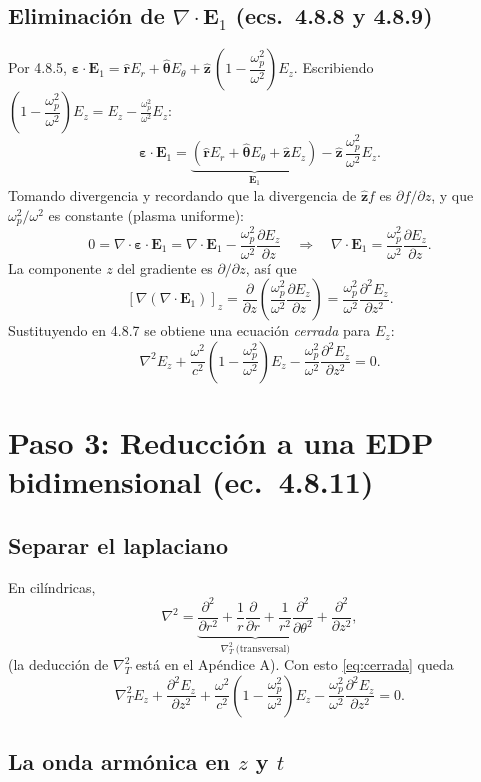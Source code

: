 \documentclass[11pt,a4paper]{article}
\newcommand{\E}{\mathbf{E}}
\newcommand{\eps}{\boldsymbol{\varepsilon}}
\renewcommand{\wp}{\omega_p}
\newcommand{\rr}{\hat{\mathbf{r}}}
\newcommand{\tth}{\hat{\boldsymbol{\theta}}}
\newcommand{\zz}{\hat{\mathbf{z}}}
\newcommand{\Kp}{\left(1-\dfrac{\wp^2}{\omega^2}\right)}
\begin{document}
\subsection{Eliminación de $\nabla\cdot\E_1$ (ecs.\ 4.8.8 y 4.8.9)}
Por 4.8.5, $\eps\cdot\E_1=\rr E_r+\tth E_\theta+\zz\,\Kp E_z$. Escribiendo $\Kp E_z=E_z-\frac{\wp^2}{\omega^2}E_z$:
\[
\eps\cdot\E_1=\underbrace{\left(\rr E_r+\tth E_\theta+\zz E_z\right)}_{\E_1}-\zz\,\frac{\wp^2}{\omega^2}E_z .
\]
Tomando divergencia y recordando que la divergencia de $\zz f$ es $\partial f/\partial z$, y que $\wp^2/\omega^2$ es constante (plasma uniforme):
\[
0=\nabla\cdot\eps\cdot\E_1=\nabla\cdot\E_1-\frac{\wp^2}{\omega^2}\frac{\partial E_z}{\partial z}
\quad\Longrightarrow\quad
\nabla\cdot\E_1=\frac{\wp^2}{\omega^2}\frac{\partial E_z}{\partial z}. \tag{4.8.8}
\]
La componente $z$ del gradiente es $\partial/\partial z$, así que
\[
[\nabla(\nabla\cdot\E_1)]_z=\frac{\partial}{\partial z}\left(\frac{\wp^2}{\omega^2}\frac{\partial E_z}{\partial z}\right)=\frac{\wp^2}{\omega^2}\frac{\partial^2E_z}{\partial z^2}. \tag{4.8.9}
\]
Sustituyendo en 4.8.7 se obtiene una ecuación \emph{cerrada} para $E_z$:
\begin{equation}
\nabla^2E_z+\frac{\omega^2}{c^2}\Kp E_z-\frac{\wp^2}{\omega^2}\frac{\partial^2E_z}{\partial z^2}=0 .
\label{eq:cerrada}
\end{equation}

\section{Paso 3: Reducción a una EDP bidimensional (ec.\ 4.8.11)}

\subsection{Separar el laplaciano}
En cilíndricas,
\[
\nabla^2=\underbrace{\frac{\partial^2}{\partial r^2}+\frac1r\frac{\partial}{\partial r}+\frac1{r^2}\frac{\partial^2}{\partial\theta^2}}_{\nabla_T^2\ \text{(transversal)}}+\frac{\partial^2}{\partial z^2},
\]
(la deducción de $\nabla_T^2$ está en el Apéndice A). Con esto \eqref{eq:cerrada} queda
\[
\nabla_T^2E_z+\frac{\partial^2E_z}{\partial z^2}+\frac{\omega^2}{c^2}\Kp E_z-\frac{\wp^2}{\omega^2}\frac{\partial^2E_z}{\partial z^2}=0 .
\]

\subsection{La onda armónica en $z$ y $t$}
\end{document}
